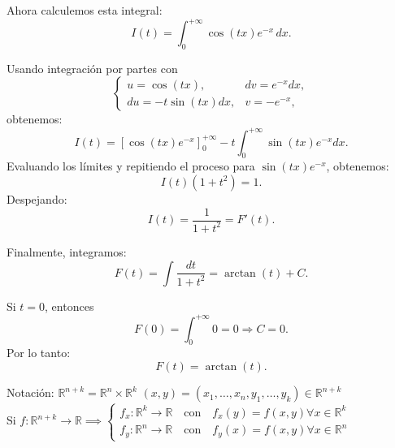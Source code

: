 {Ahora calculemos esta integral:
\[ I(t) = \int_{0}^{+\infty} \cos(tx) e^{-x} \,dx. \]

Usando integración por partes con
\[
    \begin{cases}
        u = \cos(tx),      & dv = e^{-x}dx, \\
        du = -t\sin(tx)dx, & v = -e^{-x},
    \end{cases}
\]
obtenemos:
\[ I(t) = [\cos(tx) e^{-x}]_{0}^{+\infty} - t \int_{0}^{+\infty} \sin(tx) e^{-x}dx. \]
Evaluando los límites y repitiendo el proceso para \( \sin(tx) e^{-x} \),
obtenemos:
\[ I(t) (1+t^2) = 1. \]
Despejando:
\[ I(t) = \frac{1}{1+t^2} = F'(t). \]

Finalmente, integramos:
\[ F(t) = \int \frac{dt}{1+t^2} = \arctan(t) + C. \]

Si \( t = 0 \), entonces
\[ F(0) = \int_{0}^{+\infty} 0 = 0 \Rightarrow C = 0. \]
Por lo tanto:
\[ F(t) = \arctan(t). \]
}

\begin{observación}
Notación: $\mathbb{R}^{n+k} = \mathbb{R}^n \times \mathbb{R}^{k}$
$(x, y) = (x_1, \dots, x_n, y_1, \dots, y_k) \in \mathbb{R}^{n+k}$ \\
Si $f: \mathbb{R}^{n+k} \to \mathbb{R} \implies \begin{cases}
        f_{x}: \mathbb{R}^k \to \mathbb{R} \quad \text{con} \quad f_{x}(y) = f(x, y) \forall x \in \mathbb{R}^k \\
        f_{y}: \mathbb{R}^n \to \mathbb{R} \quad \text{con} \quad f_{y}(x) = f(x, y)\forall x \in \mathbb{R}^n
    \end{cases}$
\end{observación}

